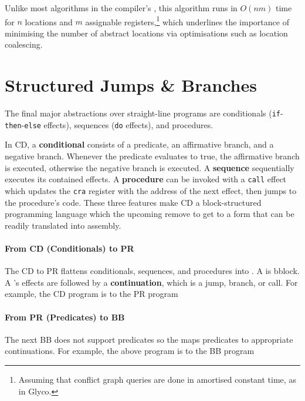 \documentclass[main.tex]{subfiles}
\begin{document}
Unlike most algorithms in the compiler's , this algorithm runs in $O(nm)$ time for $n$ locations and $m$ assignable registers,\footnote{Assuming that conflict graph queries are done in amortised constant time, as in Glyco.} which underlines the importance of minimising the number of abstract locations via optimisations such as location coalescing.

\section{Structured Jumps \& Branches} \label{sct:cd}
The final major abstractions over straight-line programs are conditionals (\texttt{if}-\texttt{then}-\texttt{else} effects), sequences (\texttt{do} effects), and procedures.

In CD, a \textbf{conditional} consists of a predicate, an affirmative branch, and a negative branch. Whenever the predicate evaluates to true, the affirmative branch is executed, otherwise the negative branch is executed. A \textbf{sequence} sequentially executes its contained effects. A \textbf{procedure} can be invoked with a \texttt{call} effect which updates the \texttt{cra} register with the address of the next effect, then jumps to the procedure's code. These three features make CD a block-structured programming language which the upcoming  remove to get to a form that can be readily translated into assembly.

\paragraph{From CD (Conditionals) to PR} The CD to PR  flattens conditionals, sequences, and procedures into . A \textbf{} is \glsdesc*{bblock}. A 's effects are followed by a \textbf{continuation}, which is a jump, branch, or call. For example, the CD program
is \lowered{} to the PR program

\paragraph{From PR (Predicates) to BB} The next  BB does not support predicates so the  maps predicates to appropriate continuations. For example, the above program is \lowered{} to the BB program
\end{document}
